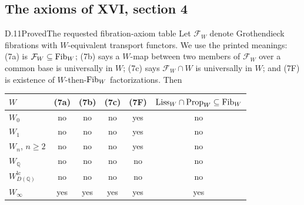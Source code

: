 \subsection{The axioms of XVI, section 4}
\begin{claim}{D.11}{Proved}{The requested fibration-axiom table}
Let $\mathcal F_W$ denote Grothendieck fibrations with $W$-equivalent transport functors. We use the printed meanings: (7a) is $\mathcal F_W\subseteq\mathrm{Fib}_W$; (7b) says a $W$-map between two members of $\mathcal F_W$ over a common base is universally in $W$; (7c) says $\mathcal F_W\cap W$ is universally in $W$; and (7F) is existence of $W$-then-$\mathrm{Fib}_W$ factorizations. Then
\begin{center}\begin{tabular}{lccccc}
\toprule $W$ & (7a)&(7b)&(7c)&(7F)&$\mathrm{Liss}_W\cap\mathrm{Prop}_W\subseteq\mathrm{Fib}_W$\\\midrule
$W_0$ & no&no&no&yes&no\\
$W_1$ & no&no&no&yes&no\\
$W_n$, $n\geq2$ & no&no&no&yes&no\\
$W_{\mathbb Q}$ & no&no&no&no&no\\
$W_{D(\mathbb Q)}^{\mathrm{lc}}$ & no&no&no&no&no\\
$W_\infty$ & yes&yes&yes&yes&yes\\\bottomrule
\end{tabular}\end{center}
\end{claim}
